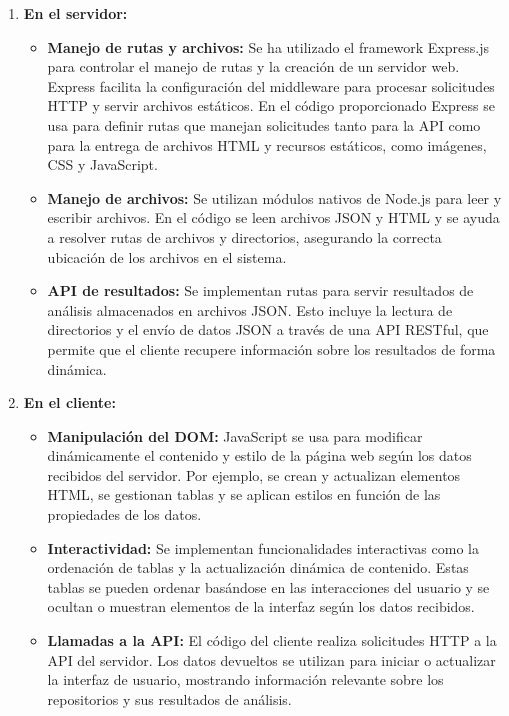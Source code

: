 \documentclass[a4paper, 12pt]{book}
\begin{document}
\begin{enumerate}
    \item \textbf{En el servidor:}
    \begin{itemize}
        \item \textbf{Manejo de rutas y archivos:} Se ha utilizado el framework Express.js para controlar el manejo de rutas y la creación de un servidor web. Express facilita la configuración del middleware para procesar solicitudes HTTP y servir archivos estáticos. En el código proporcionado Express se usa para definir rutas que manejan solicitudes tanto para la API como para la entrega de archivos HTML y recursos estáticos, como imágenes, CSS y JavaScript.
        \item \textbf{Manejo de archivos:} Se utilizan módulos nativos de Node.js para leer y escribir archivos. En el código se leen archivos JSON y HTML y se ayuda a resolver rutas de archivos y directorios, asegurando la correcta ubicación de los archivos en el sistema.
        \item \textbf{API de resultados:} Se implementan rutas para servir resultados de análisis almacenados en archivos JSON. Esto incluye la lectura de directorios y el envío de datos JSON a través de una API RESTful, que permite que el cliente recupere información sobre los resultados de forma dinámica.
    \end{itemize}
    
    \item \textbf{En el cliente:}
    \begin{itemize}
        \item \textbf{Manipulación del DOM:} JavaScript se usa para modificar dinámicamente el contenido y estilo de la página web según los datos recibidos del servidor. Por ejemplo, se crean y actualizan elementos HTML, se gestionan tablas y se aplican estilos en función de las propiedades de los datos.
        \item \textbf{Interactividad:} Se implementan funcionalidades interactivas como la ordenación de tablas y la actualización dinámica de contenido. Estas tablas se pueden ordenar basándose en las interacciones del usuario y se ocultan o muestran elementos de la interfaz según los datos recibidos.
        \item \textbf{Llamadas a la API:} El código del cliente realiza solicitudes HTTP a la API del servidor. Los datos devueltos se utilizan para iniciar o actualizar la interfaz de usuario, mostrando información relevante sobre los repositorios y sus resultados de análisis.
    \end{itemize}
\end{enumerate}
\end{document}

